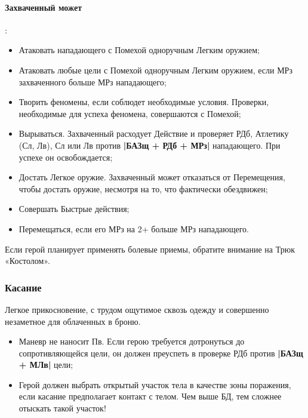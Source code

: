 \paragraph{Захваченный может}:
\begin{itemize}
  \item Атаковать нападающего с Помехой одноручным Легким оружием;
  \item Атаковать любые цели с Помехой одноручным Легким оружием, если МРз захваченного больше МРз нападающего;
  \item Творить феномены, если соблюдет необходимые условия. Проверки, необходимые для успеха феномена, совершаются с Помехой;
  \item Вырываться. Захваченный расходует Действие и проверяет РДб, Атлетику (Сл, Лв), Сл или Лв против \textbf{|БАЗщ + РДб + МРз|} нападающего. При успехе он освобождается;
  \item Достать Легкое оружие. Захваченный может отказаться от Перемещения, чтобы достать оружие, несмотря на то, что фактически обездвижен;
  \item Совершать Быстрые действия;
  \item Перемещаться, если его МРз на 2+ больше МРз нападающего. 
\end{itemize}
\begin{tcolorbox}
  Если герой планирует применять болевые приемы, обратите внимание на Трюк «Костолом».
\end{tcolorbox}

\subsubsection{Касание}
Легкое прикосновение, с трудом ощутимое сквозь одежду и совершенно незаметное для облаченных в броню.
\begin{itemize}
  \item Маневр не наносит Пв. Если герою требуется дотронуться до сопротивляющейся цели, он должен преуспеть в проверке РДб против \textbf{|БАЗщ + МЛв|} цели;
  \item \tbd Герой должен выбрать открытый участок тела в качестве зоны поражения, если касание предполагает контакт с телом. Чем выше БД, тем сложнее отыскать такой участок!
\end{itemize}

